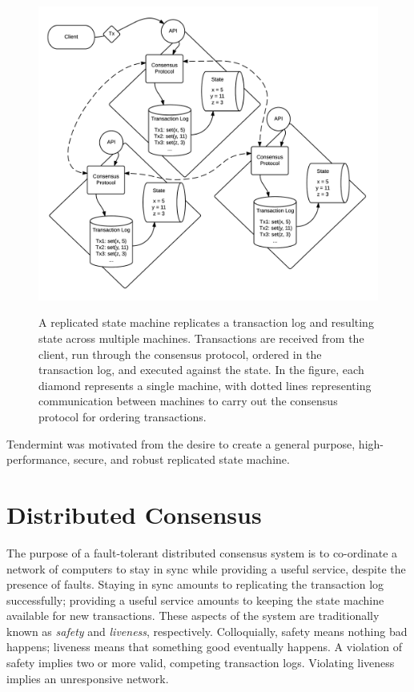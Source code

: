 \begin{figure}[]
	\includegraphics[width=\linewidth,height=\textheight,keepaspectratio]{figures/state_machine.png}
    	\centering
	\label{fig:replicated_state_machine}
	\caption[Overview of replicated state machine architecture]{
A replicated state machine replicates a transaction log and resulting state across multiple machines. 
Transactions are received from the client, 
run through the consensus protocol, 
ordered in the transaction log,
and executed against the state. 
In the figure, each diamond represents a single machine, 
with dotted lines representing communication between machines to carry out the consensus protocol for ordering transactions.}
\end{figure}

Tendermint was motivated from the desire to create a general purpose, high-performance, secure, and robust replicated state machine.

\section{Distributed Consensus}

The purpose of a fault-tolerant distributed consensus system is to co-ordinate a network of computers to 
stay in sync while providing a useful service, despite the presence of faults.
Staying in sync amounts to replicating the transaction log successfully; 
providing a useful service amounts to keeping the state machine available for new transactions.
These aspects of the system are traditionally known as \emph{safety} and \emph{liveness}, respectively.
Colloquially, safety means nothing bad happens; liveness means that something good eventually happens.
A violation of safety implies two or more valid, competing transaction logs.
Violating liveness implies an unresponsive network.

